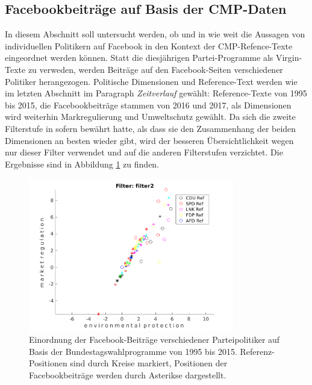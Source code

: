     \subsection{Facebookbeiträge auf Basis der CMP-Daten}
    In diesem Abschnitt soll untersucht werden, ob und in wie weit die Aussagen von individuellen Politikern auf Facebook in den Kontext der CMP-Refence-Texte eingeordnet werden können.
     Statt die diesjährigen Partei-Programme als Virgin-Texte zu verweden, werden Beiträge auf den Facebook-Seiten verschiedener Politiker herangezogen. Politische Dimensionen und Reference-Text werden wie im letzten Abschnitt im Paragraph \emph{Zeitverlauf} gewählt: Reference-Texte von 1995 bis 2015, die Facebookbeiträge stammen von 2016 und 2017, als Dimensionen wird weiterhin Markregulierung und Umweltschutz gewählt. Da sich die zweite Filterstufe in sofern bewährt hatte, als dass sie den Zusammenhang der beiden Dimensionen an besten wieder gibt, wird der besseren Übersichtlichkeit wegen nur dieser Filter verwendet und auf die anderen Filterstufen verzichtet. Die Ergebnisse sind in Abbildung \ref{fig:fbFilter2} zu finden.
     
     
    \begin{figure}
    
        \includegraphics[width = 0.8\textwidth]{images/fb_environmental_protection_market_regulation_filter2.png}
        \caption{Einordnung der Facebook-Beiträge verschiedener Parteipolitiker auf Basis der Bundestagswahlprogramme von 1995 bis 2015. Referenz-Positionen sind durch Kreise markiert, Positionen der Facebookbeiträge werden durch Asterikse dargestellt.
                 \label{fig:fbFilter2}}
    \end{figure}
     
